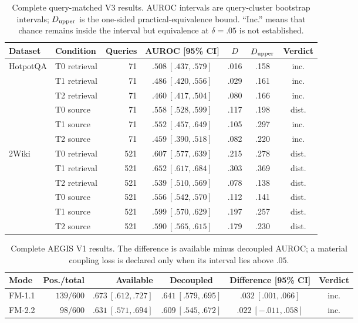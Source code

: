 \documentclass{article}
\begin{document}
\begin{table}[h]
\centering\scriptsize
\caption{Complete query-matched V3 results. AUROC intervals are query-cluster bootstrap
intervals; $D_{\rm upper}$ is the one-sided practical-equivalence bound. ``Inc.'' means that
chance remains inside the interval but equivalence at $\delta=.05$ is not established.}
\label{tab:v3-full}
\begin{tabular}{@{}llrcccc@{}}
\toprule
Dataset & Condition & Queries & AUROC [95\% CI] & $D$ & $D_{\rm upper}$ & Verdict \\
\midrule
HotpotQA & T0 retrieval & 71 & $.508\ [.437,.579]$ & .016 & .158 & inc. \\
 & T1 retrieval & 71 & $.486\ [.420,.556]$ & .029 & .161 & inc. \\
 & T2 retrieval & 71 & $.460\ [.417,.504]$ & .080 & .166 & inc. \\
 & T0 source & 71 & $.558\ [.528,.599]$ & .117 & .198 & dist. \\
 & T1 source & 71 & $.552\ [.457,.649]$ & .105 & .297 & inc. \\
 & T2 source & 71 & $.459\ [.390,.518]$ & .082 & .220 & inc. \\
\midrule
2Wiki & T0 retrieval & 521 & $.607\ [.577,.639]$ & .215 & .278 & dist. \\
 & T1 retrieval & 521 & $.652\ [.617,.684]$ & .303 & .369 & dist. \\
 & T2 retrieval & 521 & $.539\ [.510,.569]$ & .078 & .138 & dist. \\
 & T0 source & 521 & $.556\ [.542,.570]$ & .112 & .141 & dist. \\
 & T1 source & 521 & $.599\ [.570,.629]$ & .197 & .257 & dist. \\
 & T2 source & 521 & $.590\ [.565,.615]$ & .179 & .230 & dist. \\
\bottomrule
\end{tabular}
\end{table}

\begin{table}[h]
\centering\scriptsize
\caption{Complete AEGIS V1 results. The difference is available minus decoupled AUROC; a
material coupling loss is declared only when its interval lies above $.05$.}
\label{tab:aegis-full}
\begin{tabular}{@{}lrrccc@{}}
\toprule
Mode & Pos./total & Available & Decoupled & Difference [95\% CI] & Verdict \\
\midrule
FM-1.1 & $139/600$ & $.673\ [.612,.727]$ & $.641\ [.579,.695]$ & $.032\ [.001,.066]$ & inc. \\
FM-2.2 & $98/600$ & $.631\ [.571,.694]$ & $.609\ [.545,.672]$ & $.022\ [-.011,.058]$ & inc. \\
\bottomrule
\end{tabular}
\end{table}
\end{document}
